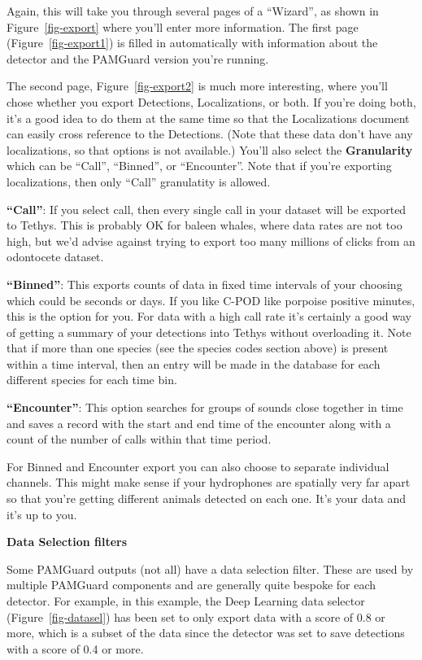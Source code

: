 \documentclass[
]{article}
\begin{document}
Again, this will take you through several pages of a ``Wizard'', as
shown in Figure~\ref{fig-export} where you'll enter more information.
The first page (Figure~\ref{fig-export1}) is filled in automatically
with information about the detector and the PAMGuard version you're
running.

The second page, Figure~\ref{fig-export2} is much more interesting,
where you'll chose whether you export Detections, Localizations, or
both. If you're doing both, it's a good idea to do them at the same time
so that the Localizations document can easily cross reference to the
Detections. (Note that these data don't have any localizations, so that
options is not available.) You'll also select the \textbf{Granularity}
which can be ``Call'', ``Binned'', or ``Encounter''. Note that if you're
exporting localizations, then only ``Call'' granulatity is allowed.

\textbf{``Call''}: If you select call, then every single call in your
dataset will be exported to Tethys. This is probably OK for baleen
whales, where data rates are not too high, but we'd advise against
trying to export too many millions of clicks from an odontocete dataset.

\textbf{``Binned''}: This exports counts of data in fixed time intervals
of your choosing which could be seconds or days. If you like C-POD like
porpoise positive minutes, this is the option for you. For data with a
high call rate it's certainly a good way of getting a summary of your
detections into Tethys without overloading it. Note that if more than
one species (see the species codes section above) is present within a
time interval, then an entry will be made in the database for each
different species for each time bin.

\textbf{``Encounter''}: This option searches for groups of sounds close
together in time and saves a record with the start and end time of the
encounter along with a count of the number of calls within that time
period.

For Binned and Encounter export you can also choose to separate
individual channels. This might make sense if your hydrophones are
spatially very far apart so that you're getting different animals
detected on each one. It's your data and it's up to you.

\textbf{Data Selection filters}

Some PAMGuard outputs (not all) have a data selection filter. These are
used by multiple PAMGuard components and are generally quite bespoke for
each detector. For example, in this example, the Deep Learning data
selector (Figure~\ref{fig-datasel}) has been set to only export data
with a score of 0.8 or more, which is a subset of the data since the
detector was set to save detections with a score of 0.4 or more.
\end{document}
